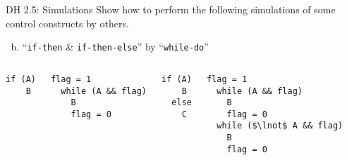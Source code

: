 \begin{frame}[fragile]{}
  \begin{exampleblock}{DH 2.5: Simulations}
    Show how to perform the following simulations of some control constructs by others.
    \begin{enumerate}[(a)]
      \setcounter{enumi}{(1)}
      \item ``\texttt{if-then} \& \texttt{if-then-else}'' by ``\texttt{while-do}''
    \end{enumerate}
  \end{exampleblock}

  \begin{columns}
      \pause
      \begin{lstlisting}[style = Cstyle, backgroundcolor = \color{teal!10!lightgray}]
  if (A)
    B
      \end{lstlisting}

      \pause
      \begin{lstlisting}[style = Cstyle]
  flag = 1
  while (A && flag)
    B
    flag = 0
      \end{lstlisting}
      \pause
      \begin{lstlisting}[style = Cstyle, backgroundcolor = \color{teal!10!lightgray}]
  if (A)
    B
  else
    C
      \end{lstlisting}

      \pause
      \begin{lstlisting}[style = Cstyle]
  flag = 1
  while (A && flag)
    B
    flag = 0
  while ($\lnot$ A && flag)
    B
    flag = 0
      \end{lstlisting}
  \end{columns}
\end{frame}

